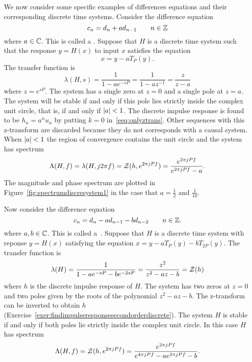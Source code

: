 We now consider some specific examples of differences equations and their corresponding discrete time systems.  Consider the difference equation
\[
c_n = d_n + a d_{n-1} \qquad n \in {\mathbb Z}
\]
where $a \in {\mathbb C}$.  This is called a .  Suppose that $H$ is a discrete time system such that the response $y = H(x)$ to input $x$ satisfies the equation
\[
x = y - a T_{P}(y).
\]
The transfer function is
\[
\lambda(H,s) = \frac{1}{1 - a e^{-sP}} = \frac{1}{1 - a z^{-1}} = \frac{z}{z - a}
\]
where $z = e^{sP}$.  The system has a single zero at $z=0$ and a single pole at $z = a$.  The system will be stable if and only if this pole lies strictly inside the complex unit circle, that is, if and only if $\left\vert a \right\vert < 1$.  The discrete impulse response is found to be $h_n = a^n u_n$ by putting $k=0$ in~\eqref{eeq:onlyztrans}.  Other sequences with this z-transform are discarded because they do not corresponds with a causal system.  %
When $\left\vert a \right\vert < 1$ the region of convergence contains the unit circle and the system has spectrum
\[
\Lambda(H,f) = \lambda(H,j2\pi f) = {\mathcal Z}(h, e^{2\pi j P f}) = \frac{e^{2\pi j P f}}{e^{2\pi j P f} - a}.
\]
The magnitude and phase spectrum are plotted in Figure~\ref{fig:spectrumdiscresystem1} in the case that $a = \tfrac{1}{2}$ and $\tfrac{1}{10}$.

Now consider the difference equation
\[
c_n = d_n - a d_{n-1} - b d_{n-2} \qquad n \in {\mathbb Z}.
\]
where $a,b \in {\mathbb C}$.  This is called a~.  Suppose that $H$ is a discrete time system with reponse $y=H(x)$ satisfying the equation $x = y - aT_{P}(y) - b T_{2P}(y)$.  The transfer function is
\[
\lambda(H) = \frac{1}{1 - a e^{-sP} - b e^{-2sP}} = \frac{z^2}{z^2 - a z - b} = {\mathcal Z}(h)
\]
where $h$ is the discrete impulse response of $H$.  The system has two zeros at $z = 0$ and two poles given by the roots of the polynomial $z^2 - a z - b$.  The z-transform can be inverted to obtain $h$ (Exercise~\ref{exer:findimpulseresponsesecondorderdiscrete}).  The system $H$ is stable if and only if both poles lie strictly inside the complex unit circle.  In this case $H$ has spectrum
\[
\Lambda(H,f) = {\mathcal Z}(h, e^{2\pi j P f}) = \frac{e^{2\pi jP f}}{e^{4\pi jP f} - a e^{2\pi jP f} - b}.
\]

